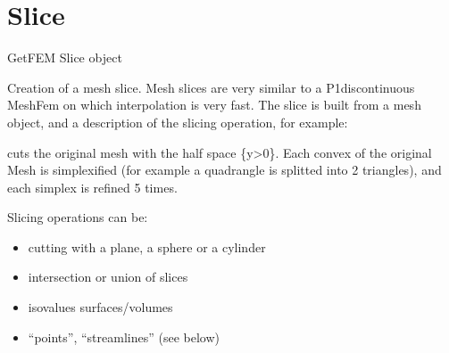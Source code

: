 \documentclass[a4paper,11pt,english]{sphinxmanual}
\begin{document}
\section{Slice}
\label{\detokenize{python/cmdref_Slice:slice}}\label{\detokenize{python/cmdref_Slice::doc}}

\begin{fulllineitems}
\label{\detokenize{python/cmdref_Slice:getfem.Slice}}
GetFEM Slice object

Creation of a mesh slice. Mesh slices are very similar to a
P1\sphinxhyphen{}discontinuous MeshFem on which interpolation is very fast. The slice is
built from a mesh object, and a description of the slicing operation, for
example:

\begin{sphinxVerbatim}[commandchars=\\\{\}]
  \PYG{p}{[}\PYG{p}{[}\PYG{p}{]}\PYG{p}{[}\PYG{p}{]}\PYG{p}{]}\PYG{p}{[}\PYG{p}{[}\PYG{p}{]}\PYG{p}{[}\PYG{p}{]}\PYG{p}{]}  
\end{sphinxVerbatim}

cuts the original mesh with the half space \{y\textgreater{}0\}. Each convex of the
original Mesh  is simplexified (for example a quadrangle is splitted
into 2 triangles), and each simplex is refined 5 times.

Slicing operations can be:
\begin{itemize}
\item {} 
cutting with a plane, a sphere or a cylinder

\item {} 
intersection or union of slices

\item {} 
isovalues surfaces/volumes

\item {} 
“points”, “streamlines” (see below)

\end{itemize}


\end{fulllineitems}
\end{document}
